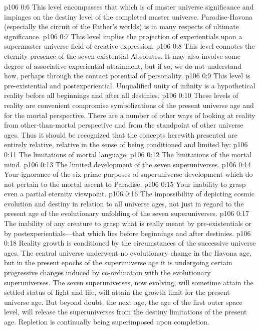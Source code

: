 \pc \vs p106 0:6 \bibnobreakspace {} This level encompasses that which is of master universe significance and impinges on the destiny level of the completed master universe. Paradise\hyp{}Havona (especially the circuit of the Father’s worlds) is in many respects of ultimate significance.
\pc \vs p106 0:7 \bibnobreakspace {} This level implies the projection of experientials upon a supermaster universe field of creative expression.
\pc \vs p106 0:8 \bibnobreakspace {} This level connotes the eternity presence of the seven existential Absolutes. It may also involve some degree of associative experiential attainment, but if so, we do not understand how, perhaps through the contact potential of personality.
\pc \vs p106 0:9 \bibnobreakspace {} This level is pre\hyp{}existential and postexperiential. Unqualified unity of infinity is a hypothetical reality before all beginnings and after all destinies.
\pc \vs p106 0:10 These levels of reality are convenient compromise symbolizations of the present universe age and for the mortal perspective. There are a number of other ways of looking at reality from other\hyp{}than\hyp{}mortal perspective and from the standpoint of other universe ages. Thus it should be recognized that the concepts herewith presented are entirely relative, relative in the sense of being conditioned and limited by:
\pc \vs p106 0:11 \bibnobreakspace The limitations of mortal language.
\pc \vs p106 0:12 \bibnobreakspace The limitations of the mortal mind.
\pc \vs p106 0:13 \bibnobreakspace The limited development of the seven superuniverses.
\pc \vs p106 0:14 \bibnobreakspace Your ignorance of the six prime purposes of superuniverse development which do not pertain to the mortal ascent to Paradise.
\pc \vs p106 0:15 \bibnobreakspace Your inability to grasp even a partial eternity viewpoint.
\pc \vs p106 0:16 \bibnobreakspace The impossibility of depicting cosmic evolution and destiny in relation to all universe ages, not just in regard to the present age of the evolutionary unfolding of the seven superuniverses.
\pc \vs p106 0:17 \bibnobreakspace The inability of any creature to grasp what is really meant by pre\hyp{}existentials or by postexperientials---that which lies before beginnings and after destinies.
\pc \vs p106 0:18 Reality growth is conditioned by the circumstances of the successive universe ages. The central universe underwent no evolutionary change in the Havona age, but in the present epochs of the superuniverse age it is undergoing certain progressive changes induced by co\hyp{}ordination with the evolutionary superuniverses. The seven superuniverses, now evolving, will sometime attain the settled status of light and life, will attain the growth limit for the present universe age. But beyond doubt, the next age, the age of the first outer space level, will release the superuniverses from the destiny limitations of the present age. Repletion is continually being superimposed upon completion.

